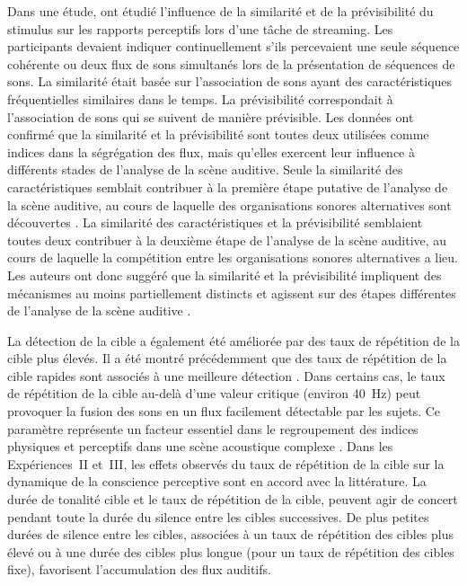 Dans une étude, \cite{bendixen2013different} ont étudié l'influence de la similarité et de la prévisibilité du stimulus sur les rapports perceptifs lors d'une tâche de streaming. 
Les participants devaient indiquer continuellement s'ils percevaient une seule séquence cohérente ou deux flux de sons simultanés lors de la présentation de séquences de sons. 
La similarité était basée sur l'association de sons ayant des caractéristiques fréquentielles similaires dans le temps. 
La prévisibilité correspondait à l'association de sons qui se suivent de manière prévisible. 
Les données ont confirmé que la similarité et la prévisibilité sont toutes deux utilisées comme indices dans la ségrégation des flux, mais qu'elles exercent leur influence à différents stades de l'analyse de la scène auditive. 
Seule la similarité des caractéristiques semblait contribuer à la première étape putative de l'analyse de la scène auditive, au cours de laquelle des organisations sonores alternatives sont découvertes \citep{bregman1994auditory}. 
La similarité des caractéristiques et la prévisibilité semblaient toutes deux contribuer à la deuxième étape de l'analyse de la scène auditive, au cours de laquelle la compétition entre les organisations sonores alternatives a lieu. 
Les auteurs ont donc suggéré que la similarité et la prévisibilité impliquent des mécanismes au moins partiellement distincts et agissent sur des étapes différentes de l'analyse de la scène auditive \citep{bendixen2013different}.

La détection de la cible a également été améliorée par des taux de répétition de la cible plus élevés. 
Il a été montré précédemment que des taux de répétition de la cible rapides sont associés à une meilleure détection \citep{xiang2010competing, akram2014investigating}. 
Dans certains cas, le taux de répétition de la cible au-delà d'une valeur critique (environ $40$~Hz) peut provoquer la fusion des sons en un flux facilement détectable par les sujets. 
Ce paramètre représente un facteur essentiel dans le regroupement des indices physiques et perceptifs dans une scène acoustique complexe \citep{moore2002factors}. 
Dans les Expériences~II et~III, les effets observés du taux de répétition de la cible sur la dynamique de la conscience perceptive sont en accord avec la littérature.
La durée de tonalité cible et le taux de répétition de la cible, peuvent agir de concert pendant toute la durée du silence entre les cibles successives. 
De plus petites durées de silence entre les cibles, associées à un taux de répétition des cibles plus élevé ou à une durée des cibles plus longue (pour un taux de répétition des cibles fixe), favorisent l'accumulation des flux auditifs.

